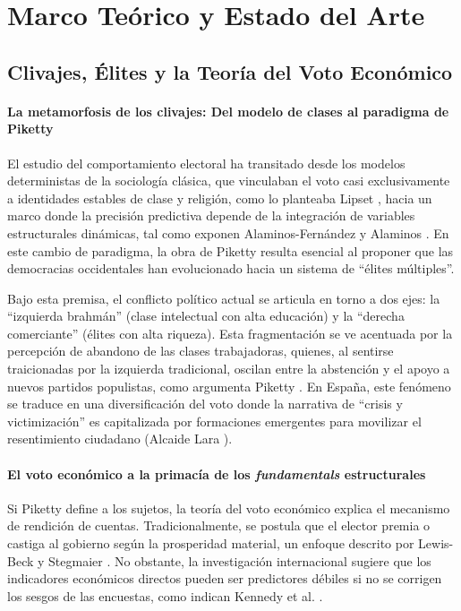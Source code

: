 \chapter{Marco Teórico y Estado del Arte}

\section{Clivajes, Élites y la Teoría del Voto Económico}

\subsubsection{La metamorfosis de los clivajes: Del modelo de clases al paradigma de Piketty}
El estudio del comportamiento electoral ha transitado desde los modelos deterministas de la sociología clásica, que vinculaban el voto casi exclusivamente a identidades estables de clase y religión, como lo planteaba Lipset \cite{lipset1959}, hacia un marco donde la precisión predictiva depende de la integración de variables estructurales dinámicas, tal como exponen Alaminos-Fernández y Alaminos \cite{alaminos2023}. En este cambio de paradigma, la obra de Piketty \cite{piketty2018, piketty2021} resulta esencial al proponer que las democracias occidentales han evolucionado hacia un sistema de ``élites múltiples''.

Bajo esta premisa, el conflicto político actual se articula en torno a dos ejes: la ``izquierda brahmán'' (clase intelectual con alta educación) y la ``derecha comerciante'' (élites con alta riqueza). Esta fragmentación se ve acentuada por la percepción de abandono de las clases trabajadoras, quienes, al sentirse traicionadas por la izquierda tradicional, oscilan entre la abstención y el apoyo a nuevos partidos populistas, como argumenta Piketty \cite{piketty2021}. En España, este fenómeno se traduce en una diversificación del voto donde la narrativa de ``crisis y victimización'' es capitalizada por formaciones emergentes para movilizar el resentimiento ciudadano (Alcaide Lara \cite{alcaide}).

\subsubsection{El voto económico a la primacía de los \textit{fundamentals} estructurales}
Si Piketty define a los sujetos, la teoría del voto económico explica el mecanismo de rendición de cuentas. Tradicionalmente, se postula que el elector premia o castiga al gobierno según la prosperidad material, un enfoque descrito por Lewis-Beck y Stegmaier \cite{lewisbeck2019}. No obstante, la investigación internacional sugiere que los indicadores económicos directos pueden ser predictores débiles si no se corrigen los sesgos de las encuestas, como indican Kennedy et al. \cite{kennedy2017}.

